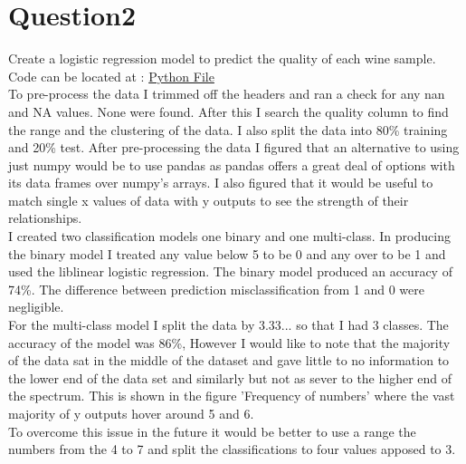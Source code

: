\documentclass[11pt,a4paper]{scrartcl}
\begin{document}
\newpage
\section{Question2}
	Create a logistic regression model to predict the quality of each wine sample.\\
Code can be located at :  \href{https://github.com/MS19393924/Assignment-1-Group-9/blob/a2b6a9d1d7f083a31166de573c10290efd0e8029/Forrest/QuestionTwoV2.py}{Python File} \\
To pre-process the data I trimmed off the headers and ran a check for any nan and NA values. None were found. After this I search the quality column to find the range and the clustering of the data. I also split the data into 80\% training and 20\% test.
After pre-processing the data I figured that an alternative to using just numpy would be to use pandas as pandas offers a great deal of options with its data frames over numpy’s arrays. I also figured that it would be useful to match single x values of data with y outputs to see the strength of their relationships.\\
I created two classification models one binary and one multi-class. In producing the binary model I treated any value below 5 to be 0 and any over to be 1 and used the liblinear logistic regression. The binary model produced an accuracy of 74\%.
The difference between prediction misclassification from 1 and 0 were negligible. \\
For the multi-class model I split the data by 3.33... so that I had 3 classes. The accuracy of the model was 86\%, However I would like to note that the majority of the data sat in the middle of the dataset and gave little to no information to the lower end of the data set and similarly but not as sever to the higher end of
the spectrum. This is shown in the figure 'Frequency of numbers' where the vast majority of y outputs hover around 5 and 6.\\
To overcome this issue in the future it would be better to use a range the numbers from the 4 to 7 and split the classifications to four values apposed to 3.
\end{document}
